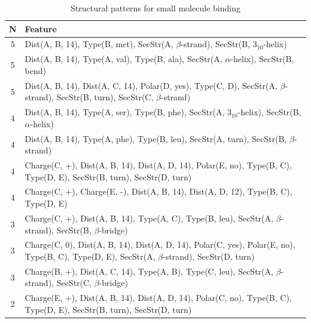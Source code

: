 \documentclass[11pt,twoside,a4paper]{book}
\begin{document}
\begin{table}\begin{tabularx}{\textwidth}{cX}\textbf{N} & \textbf{Feature} \\ \hline  
5 & Dist(A, B, 14),  Type(B, met), SecStr(A, $\beta$-strand), SecStr(B, $3_{10}$-helix)\\ \hline 
5 & Dist(A, B, 14),  Type(A, val), Type(B, ala), SecStr(A, $\alpha$-helix), SecStr(B, bend)\\ \hline 
5 & Dist(A, B, 14), Dist(A, C, 14), Polar(D, yes),  Type(C, D), SecStr(A, $\beta$-strand), \newline SecStr(B, turn), SecStr(C, $\beta$-strand)\\ \hline 
4 & Dist(A, B, 14),  Type(A, ser), Type(B, phe), SecStr(A, $3_{10}$-helix), SecStr(B, $\alpha$-helix)\\ \hline 
4 & Dist(A, B, 14),  Type(A, phe), Type(B, leu), SecStr(A, turn), SecStr(B, $\beta$-strand)\\ \hline 
4 & Charge(C, +), Dist(A, B, 14), Dist(A, D, 14), Polar(E, no),  Type(B, C), \newline Type(D, E), SecStr(B, turn), SecStr(D, turn)\\ \hline 
4 & Charge(C, +), Charge(E, -), Dist(A, B, 14), Dist(A, D, 12),  Type(B, C), Type(D, E)\\ \hline 
3 & Charge(C, +), Dist(A, B, 14),  Type(A, C), Type(B, leu), SecStr(A, $\beta$-strand), \newline SecStr(B, $\beta$-bridge)\\ \hline 
3 & Charge(C, 0), Dist(A, B, 14), Dist(A, D, 14), Polar(C, yes), Polar(E, no),  \newline Type(B, C), Type(D, E), SecStr(A, $\beta$-strand), SecStr(D, turn)\\ \hline 
3 & Charge(B, +), Dist(A, C, 14),  Type(A, B), Type(C, leu), SecStr(A, $\beta$-strand), \newline SecStr(C, $\beta$-bridge)\\ \hline 
2 & Charge(E, +), Dist(A, B, 14), Dist(A, D, 14), Polar(C, no),  Type(B, C), \newline Type(D, E), SecStr(B, turn), SecStr(D, turn)\\ \hline 
 \end{tabularx}\caption{Structural patterns for small molecule binding}\label{tab:small_molecule_binding}\end{table}
\end{document}
